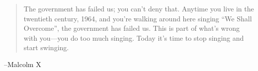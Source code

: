 \documentclass[letterpaper, landscape]{exam}
\begin{document}
  \else
    \vspace{10 cm}
    \begin{quote}
      \begin{em}
        The government has failed us; you can't deny that. Anytime you live in
        the twentieth century, 1964, and you're walking around here singing
        ``We Shall Overcome'', the government has failed us. This is part of
        what's wrong with you---you do too much singing.  Today it's time to
        stop singing and start swinging. 
        
      \end{em}
    \end{quote}
    \hspace{1 cm} --Malcolm X
  \fi
\end{document}
